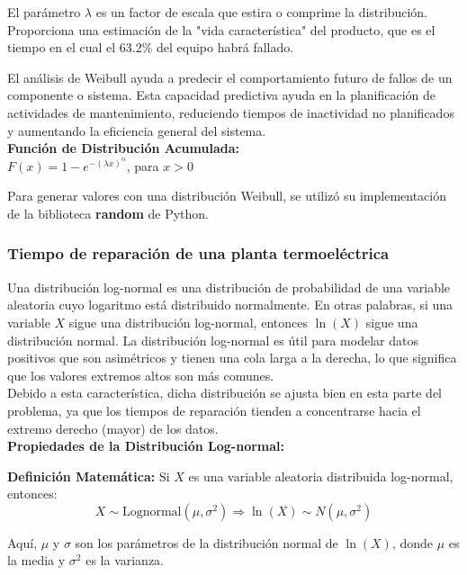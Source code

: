 \documentclass[twocolumn, fontsize=10pt]{article}
\begin{document}
El parámetro \( \lambda \) es un factor de escala que estira o comprime la distribución. Proporciona una estimación de la "vida característica" del producto, que es el tiempo en el cual el 63.2\% del equipo habrá fallado.

El análisis de Weibull ayuda a predecir el comportamiento futuro de fallos de un componente o sistema. Esta capacidad predictiva ayuda en la planificación de actividades de mantenimiento, reduciendo tiempos de inactividad no planificados y aumentando la eficiencia general del sistema.\\

\textbf{Función de Distribución Acumulada:}\\
$ F(x) = 1 - e^{-(\lambda x)^\alpha} $, para $x > 0 $

Para generar valores con una distribución Weibull, se utilizó su implementación de la biblioteca \textbf{random} de Python.

\subsubsection{Tiempo de reparación de una planta termoeléctrica}


Una distribución log-normal es una distribución de probabilidad de una variable aleatoria cuyo logaritmo está distribuido normalmente. En otras palabras, si una variable \( X \) sigue una distribución log-normal, entonces \( \ln(X) \) sigue una distribución normal. La distribución log-normal es útil para modelar datos positivos que son asimétricos y tienen una cola larga a la derecha, lo que significa que los valores extremos altos son más comunes. \\

Debido a esta característica, dicha distribución se ajusta bien en esta parte del problema, ya que los tiempos de reparación tienden a concentrarse hacia el extremo derecho (mayor) de los datos. \\

\textbf{Propiedades de la Distribución Log-normal:}

\textbf{Definición Matemática:}
Si \( X \) es una variable aleatoria distribuida log-normal, entonces:
\[ X \sim \text{Lognormal}(\mu, \sigma^2) \Rightarrow \ln(X) \sim N(\mu, \sigma^2) \]

Aquí, \( \mu \) y \( \sigma \) son los parámetros de la distribución normal de \( \ln(X) \), donde \( \mu \) es la media y \( \sigma^2 \) es la varianza. \\
\end{document}

